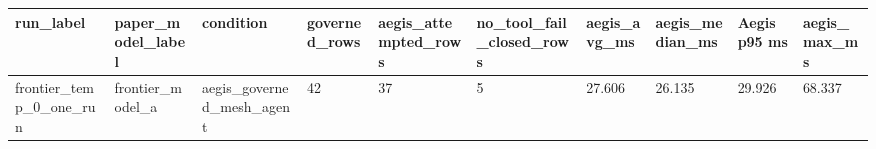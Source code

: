 \begin{tabular}{llllllllll}
 \hline
run\_label & paper\_model\_label & condition & governed\_rows & aegis\_attempted\_rows & no\_tool\_fail\_closed\_rows & aegis\_avg\_ms & aegis\_median\_ms & Aegis p95 ms & aegis\_max\_ms \\
 \hline
frontier\_temp\_0\_one\_run & frontier\_model\_a & aegis\_governed\_mesh\_agent & 42 & 37 & 5 & 27.606 & 26.135 & 29.926 & 68.337 \\
 \hline
\end{tabular}
